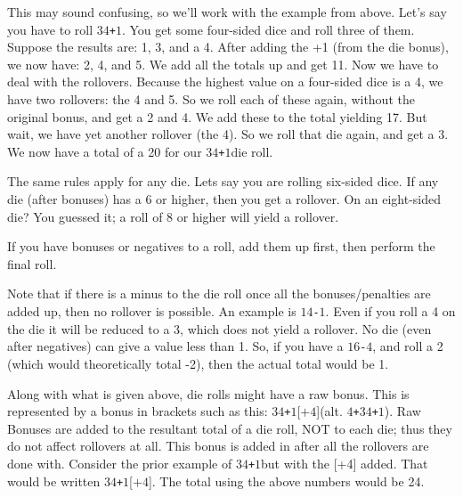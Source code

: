 \documentclass[twoside]{book}
\begin{document}
    {  
    This may sound confusing, so we'll work with
               the example from above. Let's say you have to roll
               \ensuremath{3}\ensuremath{4}\texttt{+}\ensuremath{1}. You get some four-sided dice and roll three of
               them. Suppose the results are: 1, 3, and a 4. After adding
               the +1 (from the die bonus), we now have: 2, 4, and 5. We
               add all the totals up and get 11. Now we have to deal with
               the rollovers. Because the highest value on a four-sided
               dice is a 4, we have two rollovers: the 4 and 5. So we
               roll each of these again, without the original bonus, and
               get a 2 and 4. We add these to the total yielding 17. But
               wait, we have yet another rollover (the 4). So we roll
               that die again, and get a 3. We now have a total of a 20
               for our \ensuremath{3}\ensuremath{4}\texttt{+}\ensuremath{1}die roll. 
    }
  
    {  
    The same rules apply for any die. Lets say you are
               rolling six-sided dice. If any die (after bonuses) has a 6
               or higher, then you get a rollover. On an eight-sided die?
               You guessed it; a roll of 8 or higher will yield a
               rollover. 
    }
  
    {  
    If you have bonuses or negatives to a roll, add them
               up first, then perform the final roll. 
    }
  
    {  
    Note that if there is a minus to the die roll once
               all the bonuses/penalties are added up, then no rollover
               is possible. An example is \ensuremath{1}\ensuremath{4}\texttt{-}\ensuremath{1}. Even if you roll a 4 on
               the die it will be reduced to a 3, which does not yield a
               rollover. No die (even after negatives) can give a value
               less than 1. So, if you have a \ensuremath{1}\ensuremath{6}\texttt{-}\ensuremath{4}, and roll a 2 (which
               would theoretically total -2), then the actual total would
               be 1. 
    }
  
    {  
    Along with what is given above, die rolls might have
               a raw bonus. This is represented by a bonus in brackets
               such as this: \ensuremath{3}\ensuremath{4}\texttt{+}\ensuremath{1}\textscbf{}[\ensuremath{\texttt{+}\ensuremath{4}}](alt. \ensuremath{4}\texttt{+}\ensuremath{3}\ensuremath{4}\texttt{+}\ensuremath{1}). Raw Bonuses are
               added to the resultant total of a die roll, NOT to each
               die; thus they do not affect rollovers at all. This bonus
               is added in after all the rollovers are done with.
               Consider the prior example of \ensuremath{3}\ensuremath{4}\texttt{+}\ensuremath{1}but with the [+4]
               added. That would be written \ensuremath{3}\ensuremath{4}\texttt{+}\ensuremath{1}\textscbf{}[\ensuremath{\texttt{+}\ensuremath{4}}]. The total using
               the above numbers would be 24. 
    }
  
\end{document}
